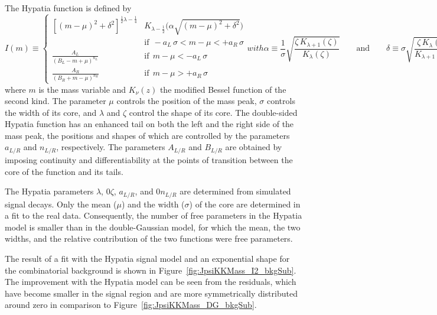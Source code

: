 The Hypatia function is defined by
\begin{subequations}
\begin{equation}
  I(m) \equiv
  \begin{cases}
    \left[(m-\mu)^{2} + \delta^{2}\right]^{\frac{1}{2} \lambda - \frac{1}{4}}
          \!\!\!\!& K_{\lambda - \frac{1}{2}}\big(\alpha \sqrt{(m-\mu)^2 + \delta^2}\big) \\
          &\text{if}\ \ -a_L\,\sigma < m - \mu < +a_R\,\sigma \\
    \frac{A_L}{(B_L - m+\mu)^{n_L}} &\text{if}\ \ m - \mu < -a_L\,\sigma \\
    \frac{A_R}{(B_R + m-\mu)^{n_R}} &\text{if}\ \ m - \mu > +a_R\,\sigma
  \end{cases}
\end{equation}
with
\begin{equation}
  \alpha\equiv\frac{1}{\sigma}\sqrt{\frac{\zeta\, K_{\lambda+1}(\zeta)}{K_\lambda(\zeta)}}
  \qquad\text{and}\qquad
  \delta\equiv\sigma\sqrt{\frac{\zeta\,K_\lambda(\zeta)}{K_{\lambda+1}(\zeta)}} \ ,
\end{equation}
\end{subequations}
where $m$ is the mass variable and $K_{\nu}(z)$ the modified Bessel function of the second kind. The parameter $\mu$ controls the position
of the mass peak, $\sigma$ controls the width of its core, and $\lambda$ and $\zeta$ control the shape of its core. The double-sided
Hypatia function has an enhanced tail on both the left and the right side of the mass peak, the positions and shapes of which are
controlled by the parameters $a_{L/R}$ and $n_{L/R}$, respectively. The parameters $A_{L/R}$ and $B_{L/R}$ are obtained by imposing
continuity and differentiability at the points of transition between the core of the function and its tails.

The Hypatia parameters $\lambda$\textapprox{}, 0\textlt$\zeta$, $a_{L/R}$, and 0\textlt$n_{L/R}$ are
determined from simulated \BstoJpsiphi{} signal decays. Only the mean ($\mu$\unitsp\MeV) and the width
($\sigma$\unitsp\MeV) of the core are determined in a fit to the real data. Consequently, the number of free parameters in the
Hypatia model is smaller than in the double-Gaussian model, for which the mean, the two widths, and the relative contribution of the two
functions were free parameters.

The result of a fit with the Hypatia signal model and an exponential shape for the combinatorial background is shown in
Figure~\ref{fig:JpsiKKMass_I2_bkgSub}. The improvement with the Hypatia model can be seen from the residuals, which have become smaller in
the signal region and are more symmetrically distributed around zero in comparison to Figure~\ref{fig:JpsiKKMass_DG_bkgSub}.

